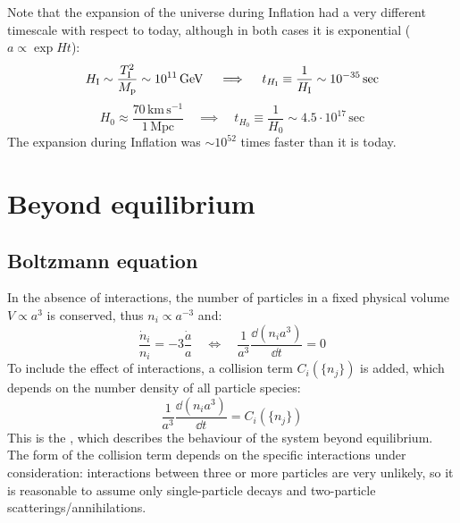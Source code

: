 Note that the expansion of the universe during Inflation had a very different timescale with respect to today, although in both cases it is exponential ($ a \propto \exp H t $):
\begin{equation*}
  H_\text{I} \sim \frac{T_\text{I}^2}{M_\text{p}} \sim 10^{11} \,\mathrm{GeV}
  \quad \implies \quad
  t_{H_\text{I}} \equiv \frac{1}{H_\text{I}} \sim 10^{-35} \,\text{sec}
\end{equation*}
\begin{equation*}
  H_0 \approx \frac{70 \,\text{km} \,\text{s}^{-1}}{1 \,\text{Mpc}}
  \quad \implies \quad
  t_{H_0} \equiv \frac{1}{H_0} \sim 4.5 \cdot 10^{17} \,\text{sec}
\end{equation*}
The expansion during Inflation was $ \sim 10^{52} $ times faster than it is today.

\section{Beyond equilibrium}

\subsection{Boltzmann equation}

In the absence of interactions, the number of particles in a fixed physical volume $ V \propto a^3 $ is conserved, thus $ n_i \propto a^{-3} $ and:
\begin{equation*}
  \frac{\dot{n}_i}{n_i} = - 3 \frac{\dot{a}}{a}
  \quad \iff \quad
  \frac{1}{a^3} \frac{\dd (n_i a^3)}{\dd t} = 0
\end{equation*}
To include the effect of interactions, a collision term $ C_i(\{n_j\}) $ is added, which depends on the number density of all particle species:
\begin{equation}
  \frac{1}{a^3} \frac{\dd (n_i a^3)}{\dd t} = C_i(\{n_j\})
\end{equation}
This is the , which describes the behaviour of the system beyond equilibrium. The form of the collision term depends on the specific interactions under consideration: interactions between three or more particles are very unlikely, so it is reasonable to assume only single-particle decays and two-particle scatterings/annihilations.

